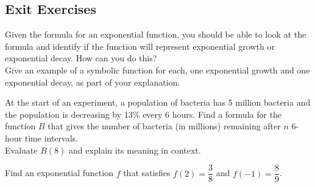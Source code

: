 \subsection*{Exit Exercises} \label{exit-exponential-intro}




\begin{myExit}
Given the formula for an exponential function, you should be able to look at the formula and identify if the function will represent exponential growth or exponential decay.  How can you do this?  \\[0.5em]
Give an example of a symbolic function for each, one exponential growth and one exponential decay, as part of your explanation.
\vfill
\vfill
\vfill
\end{myExit}


\begin{myExit}
At the start of an experiment, a population of bacteria has 5 million bacteria and the population is decreasing by 13\% every 6 hours.  Find a formula for the function $B$ that gives the number of bacteria (in millions) remaining after $n$ 6-hour time intervals. \\[0.4in]

Evaluate $B(8)$ and explain its meaning in context.
\vfill
\vfill
\vfill
\end{myExit}


\begin{myExit}
Find an exponential function $f$ that satisfies $f(2)=\dfrac{3}{8}$ and $f(-1)=\dfrac{8}{9}$.

\vfill
\vfill
\vfill
\vfill
\vfill
\end{myExit}



















